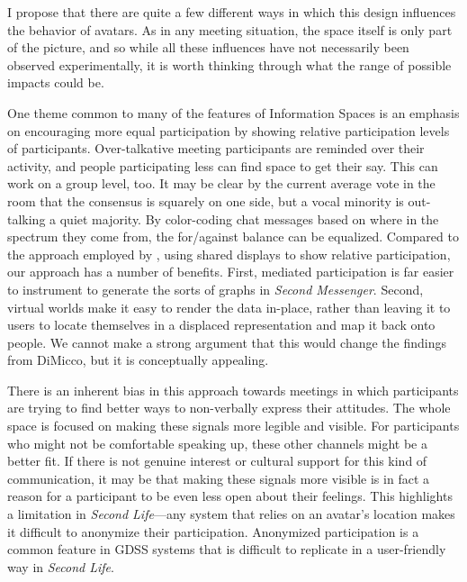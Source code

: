 I propose that there are quite a few different ways in which this design influences the behavior of avatars. As in any meeting situation, the space itself is only part of the picture, and so while all these influences have not necessarily been observed experimentally, it is worth thinking through what the range of possible impacts could be.

One theme common to many of the features of Information Spaces is an emphasis on encouraging more equal participation by showing relative participation levels of participants. Over-talkative meeting participants are reminded over their activity, and people participating less can find space to get their say. This can work on a group level, too. It may be clear by the current average vote in the room that the consensus is squarely on one side, but a vocal minority is out-talking a quiet majority. By color-coding chat messages based on where in the spectrum they come from, the for/against balance can be equalized. Compared to the approach employed by \citet{DiMicco:2007ie}, using shared displays to show relative participation, our approach has a number of benefits. First, mediated participation is far easier to instrument to generate the sorts of graphs in \emph{Second Messenger}. Second, virtual worlds make it easy to render the data in-place, rather than leaving it to users to locate themselves in a displaced representation and map it back onto people. We cannot make a strong argument that this would change the findings from DiMicco, but it is conceptually appealing.

There is an inherent bias in this approach towards meetings in which participants are trying to find better ways to non-verbally express their attitudes. The whole space is focused on making these signals more legible and visible. For participants who might not be comfortable speaking up, these other channels might be a better fit. If there is not genuine interest or cultural support for this kind of communication, it may be that making these signals more visible is in fact a reason for a participant to be even less open about their feelings. This highlights a limitation in \emph{Second Life}---any system that relies on an avatar's location makes it difficult to anonymize their participation. Anonymized participation is a common feature in GDSS systems that is difficult to replicate in a user-friendly way in \emph{Second Life}.

